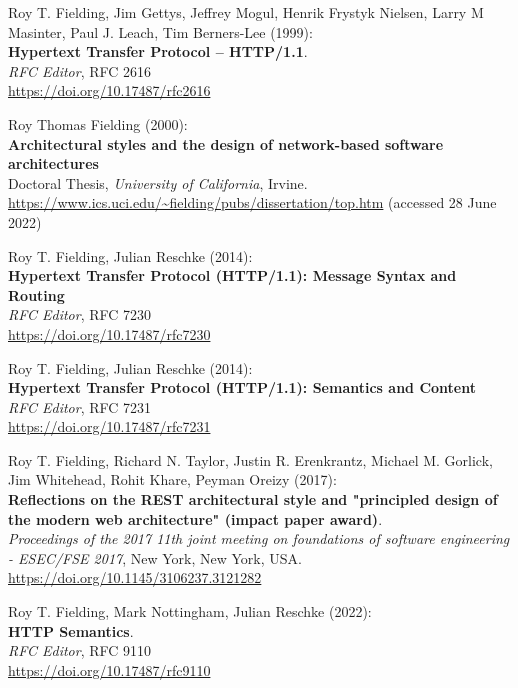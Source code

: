 \begin{thebibliography}{9}
Roy T. Fielding, Jim Gettys, Jeffrey Mogul, Henrik Frystyk Nielsen, Larry M Masinter, Paul J. Leach, Tim Berners-Lee (1999):\\
\textbf{Hypertext Transfer Protocol -- HTTP/1.1}.\\
\emph{RFC Editor}, RFC 2616\\
\url{https://doi.org/10.17487/rfc2616}


Roy Thomas Fielding (2000): \\
\textbf{Architectural styles and the design
of network-based software architectures}\\
Doctoral Thesis, 
\emph{University of California}, Irvine.\\
\url{https://www.ics.uci.edu/~fielding/pubs/dissertation/top.htm}
(accessed 28 June 2022) 


Roy T. Fielding, Julian Reschke (2014): \\
\textbf{Hypertext {Transfer
Protocol} ({HTTP}/1.1): {Message Syntax} and {Routing}}\\
\emph{RFC Editor}, RFC 7230 \\
\url{https://doi.org/10.17487/rfc7230}

Roy T. Fielding, Julian Reschke (2014): \\
\textbf{Hypertext {Transfer Protocol} ({HTTP}/1.1): {Semantics} and {Content}} \\
\emph{RFC Editor}, RFC 7231 \\
\url{https://doi.org/10.17487/rfc7231}

Roy T. Fielding, Richard N. Taylor, Justin R. Erenkrantz, Michael M.
Gorlick, Jim Whitehead, Rohit Khare, Peyman Oreizy (2017): \\
\textbf{Reflections on the {REST} architectural style and "principled
design of the modern web architecture" (impact paper award)}. \\
\emph{Proceedings of the 2017 11th joint meeting on foundations of software engineering - {ESEC}/{FSE} 2017}, New York, New York, USA.\\
\url{https://doi.org/10.1145/3106237.3121282}

Roy T. Fielding, Mark Nottingham, Julian Reschke (2022): \\
\textbf{HTTP Semantics}.\\
\emph{RFC Editor}, RFC 9110\\
\url{https://doi.org/10.17487/rfc9110}


\end{thebibliography}
